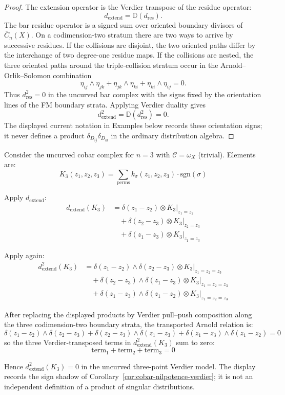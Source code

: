 \begin{proof}
The extension operator is the Verdier transpose of the residue
operator:
\[
d_{\mathrm{extend}}=\mathbb D(d_{\mathrm{res}}).
\]
The bar residue operator is a signed sum over oriented boundary
divisors of $\overline C_n(X)$. On a codimension-two stratum there are
two ways to arrive by successive residues. If the collisions are
disjoint, the two oriented paths differ by the interchange of two
degree-one residue maps. If the collisions are nested, the three
oriented paths around the triple-collision stratum occur in the
Arnold--Orlik--Solomon combination
\[
\eta_{ij}\wedge\eta_{jk}
+\eta_{jk}\wedge\eta_{ki}
+\eta_{ki}\wedge\eta_{ij}=0 .
\]
Thus $d_{\mathrm{res}}^2=0$ in the uncurved bar complex with the signs
fixed by the orientation lines of the FM boundary strata. Applying
Verdier duality gives
\[
d_{\mathrm{extend}}^2
=\mathbb D(d_{\mathrm{res}}^2)=0.
\]
The displayed current notation in Examples below records these
orientation signs; it never defines a product
$\delta_{D_{ij}}\delta_{D_{kl}}$ in the ordinary distribution algebra.
\end{proof}

\begin{example}\label{ex:three-point-signs-cobar}
Consider the uncurved cobar complex for $n=3$ with
$\mathcal{C} = \omega_X$ (trivial). Elements are:
\[K_3(z_1, z_2, z_3) = \sum_{\text{perms}} k_\sigma(z_1, z_2, z_3) \cdot
\text{sgn}(\sigma)\]

Apply $d_{\text{extend}}$:
\begin{align*}
d_{\text{extend}}(K_3) &= \delta(z_1 - z_2) \otimes K_3|_{z_1=z_2} \\
&\quad + \delta(z_2 - z_3) \otimes K_3|_{z_2=z_3} \\
&\quad + \delta(z_1 - z_3) \otimes K_3|_{z_1=z_3}
\end{align*}

Apply again:
\begin{align*}
d_{\text{extend}}^2(K_3) &= \delta(z_1 - z_2) \wedge \delta(z_2 - z_3) \otimes
K_3|_{z_1=z_2=z_3} \\
&\quad + \delta(z_2 - z_3) \wedge \delta(z_1 - z_3) \otimes K_3|_{z_1=z_2=z_3} \\
&\quad + \delta(z_1 - z_3) \wedge \delta(z_1 - z_2) \otimes K_3|_{z_1=z_2=z_3}
\end{align*}

After replacing the displayed products by Verdier pull--push
composition along the three codimension-two boundary strata, the
transported Arnold relation is:
\[\delta(z_1 - z_2) \wedge \delta(z_2 - z_3) + \delta(z_2 - z_3) \wedge \delta(z_1 - z_3) + \delta(z_1 - z_3) \wedge \delta(z_1 - z_2) = 0\]
so the three Verdier-transposed terms in
$d_{\text{extend}}^2(K_3)$ sum to zero:
\[\text{term}_1 + \text{term}_2 + \text{term}_3 = 0\]

Hence $d_{\text{extend}}^2(K_3) = 0$ in the uncurved three-point
Verdier model. The display records the sign shadow of
Corollary~\ref{cor:cobar-nilpotence-verdier}; it is not an independent
definition of a product of singular distributions.
\end{example}


